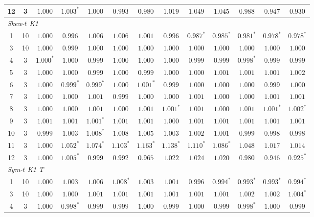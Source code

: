 \begin{table}[p]
\begin{tabular}{ccccccccccccc}
12 & 3 & $1.000$ & $1.003^{*}$ & $1.000$ & $0.993$ & $0.980$ & $1.019$ & $1.049$ & $1.045$ & $0.988$ & $0.947$ & $0.930$ \\
\midrule
\multicolumn{13}{l}{\emph{Skew-$t$ K1}} \\[1pt]
1 & 10 & $1.000$ & $0.996$ & $1.006$ & $1.006$ & $1.001$ & $0.996$ & $0.987^{*}$ & $0.985^{*}$ & $0.981^{*}$ & $0.978^{*}$ & $0.978^{*}$ \\
3 & 10 & $1.000$ & $0.999$ & $1.000$ & $1.000$ & $1.000$ & $1.000$ & $1.000$ & $1.000$ & $1.000$ & $1.000$ & $1.000$ \\
4 & 3 & $1.000^{*}$ & $1.000$ & $0.999$ & $1.000$ & $1.000$ & $1.000$ & $0.999$ & $0.999$ & $0.998^{*}$ & $0.999$ & $0.999$ \\
5 & 3 & $1.000$ & $1.000$ & $0.999$ & $1.000$ & $0.999$ & $1.000$ & $1.000$ & $1.001$ & $1.001$ & $1.001$ & $1.002$ \\
6 & 3 & $1.000$ & $0.999^{*}$ & $0.999^{*}$ & $1.000$ & $1.001^{*}$ & $0.999$ & $1.000$ & $1.000$ & $1.000$ & $0.999$ & $1.000$ \\
7 & 3 & $1.000$ & $1.000$ & $1.001$ & $0.999$ & $1.000$ & $1.000$ & $1.001$ & $1.000$ & $1.000$ & $1.001$ & $1.001$ \\
8 & 3 & $1.000$ & $1.000$ & $1.001$ & $1.000$ & $1.001$ & $1.001^{*}$ & $1.001$ & $1.000$ & $1.001$ & $1.001^{*}$ & $1.002^{*}$ \\
9 & 3 & $1.001$ & $1.001$ & $1.001^{*}$ & $1.001$ & $1.001$ & $1.000$ & $1.001$ & $1.001$ & $1.001$ & $1.001$ & $1.001$ \\
10 & 3 & $0.999$ & $1.003$ & $1.008^{*}$ & $1.008$ & $1.005$ & $1.003$ & $1.002$ & $1.001$ & $0.999$ & $0.998$ & $0.998$ \\
11 & 3 & $1.000$ & $1.052^{*}$ & $1.074^{*}$ & $1.103^{*}$ & $1.163^{*}$ & $1.138^{*}$ & $1.110^{*}$ & $1.086^{*}$ & $1.048$ & $1.017$ & $1.014$ \\
12 & 3 & $1.000$ & $1.005^{*}$ & $0.999$ & $0.992$ & $0.965$ & $1.022$ & $1.024$ & $1.020$ & $0.980$ & $0.946$ & $0.925^{*}$ \\
\midrule
\multicolumn{13}{l}{\emph{Sym-$t$ K1 T}} \\[1pt]
1 & 10 & $1.000$ & $1.003$ & $1.006$ & $1.008^{*}$ & $1.003$ & $1.001$ & $0.996$ & $0.994^{*}$ & $0.993^{*}$ & $0.993^{*}$ & $0.994^{*}$ \\
3 & 10 & $1.000$ & $1.000$ & $1.001$ & $1.001$ & $1.001$ & $1.001$ & $1.001$ & $1.001$ & $1.002$ & $1.002$ & $1.004^{*}$ \\
4 & 3 & $1.000$ & $0.998^{*}$ & $0.999$ & $0.999$ & $1.000$ & $0.999$ & $1.000$ & $0.999$ & $0.998^{*}$ & $1.000$ & $0.999$ \\

\end{tabular}
\end{table}
